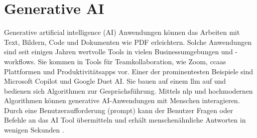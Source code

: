 \section{Generative AI}
Generative artificial intelligence (AI) Anwendungen können das Arbeiten mit Text, Bildern, Code und Dokumenten wie PDF erleichtern. Solche Anwendungen sind seit einigen Jahren wertvolle Tools in vielen Businessumgebungen und -workflows. Sie kommen in Tools für Teamkollaboration, wie Zoom, \gls{ccaas} Plattformen und Produktivitätsapps vor. Einer der prominentesten Beispiele sind Microsoft Copilot und Google Duet AI. Sie bauen auf einem \gls{llm} auf und bedienen sich Algorithmen zur Gesprächsführung. Mittels \gls{nlp} und hochmodernen Algorithmen können generative AI-Anwendungen mit Menschen interagieren. Durch eine Benutzeraufforderung (prompt) kann der Benutzer Fragen oder Befehle an das AI Tool übermitteln und erhält menschenähnliche Antworten in wenigen Sekunden \cite{copilot-duet}. \\
